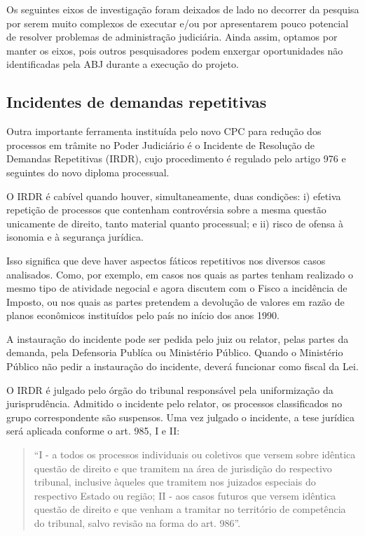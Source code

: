 \documentclass[]{report}
\begin{document}
Os seguintes eixos de investigação foram deixados de lado no decorrer da
pesquisa por serem muito complexos de executar e/ou por apresentarem
pouco potencial de resolver problemas de administração judiciária. Ainda
assim, optamos por manter os eixos, pois outros pesquisadores podem
enxergar oportunidades não identificadas pela ABJ durante a execução do
projeto.

\subsection{Incidentes de demandas
repetitivas}\label{incidentes-de-demandas-repetitivas}

Outra importante ferramenta instituída pelo novo CPC para redução dos
processos em trâmite no Poder Judiciário é o Incidente de Resolução de
Demandas Repetitivas (IRDR), cujo procedimento é regulado pelo artigo
976 e seguintes do novo diploma processual.

O IRDR é cabível quando houver, simultaneamente, duas condições: i)
efetiva repetição de processos que contenham controvérsia sobre a mesma
questão unicamente de direito, tanto material quanto processual; e ii)
risco de ofensa à isonomia e à segurança jurídica.

Isso significa que deve haver aspectos fáticos repetitivos nos diversos
casos analisados. Como, por exemplo, em casos nos quais as partes tenham
realizado o mesmo tipo de atividade negocial e agora discutem com o
Fisco a incidência de Imposto, ou nos quais as partes pretendem a
devolução de valores em razão de planos econômicos instituídos pelo país
no início dos anos 1990.

A instauração do incidente pode ser pedida pelo juiz ou relator, pelas
partes da demanda, pela Defensoria Publíca ou Ministério Público. Quando
o Ministério Público não pedir a instauração do incidente, deverá
funcionar como fiscal da Lei.

O IRDR é julgado pelo órgão do tribunal responsável pela uniformização
da jurisprudência. Admitido o incidente pelo relator, os processos
classificados no grupo correspondente são suspensos. Uma vez julgado o
incidente, a tese jurídica será aplicada conforme o art. 985, I e II:

\begin{quote}
``I - a todos os processos individuais ou coletivos que versem sobre
idêntica questão de direito e que tramitem na área de jurisdição do
respectivo tribunal, inclusive àqueles que tramitem nos juizados
especiais do respectivo Estado ou região; II - aos casos futuros que
versem idêntica questão de direito e que venham a tramitar no território
de competência do tribunal, salvo revisão na forma do art. 986''.
\end{quote}
\end{document}
